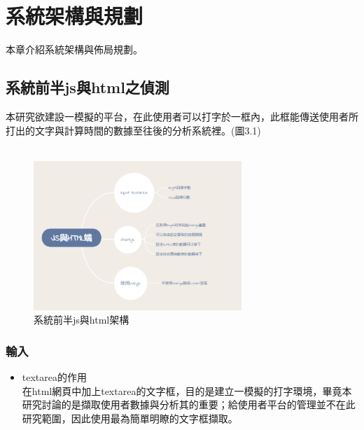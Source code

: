 \chapter{系統架構與規劃}
\label{c:intro}
本章介紹系統架構與佈局規劃。

\section{系統前半js與html之偵測} 
本研究欲建設一模擬的平台，在此使用者可以打字於一框內，此框能傳送使用者所打出的文字與計算時間的數據至往後的分析系統裡。(圖3.1)\\\\
\begin{figure}[H] %
		\centering %
		\includegraphics[width=0.7\textwidth]{1.png} %
		\caption{系統前半js與html架構} %
		\label{Fig.3.1} %
\end{figure}
\subsection{輸入}	
\begin{itemize}
	\item textarea的作用\\
	在html網頁中加上textarea的文字框，目的是建立一模擬的打字環境，畢竟本研究討論的是擷取使用者數據與分析其的重要；給使用者平台的管理並不在此研究範圍，因此使用最為簡單明瞭的文字框擷取。
\end{itemize}

